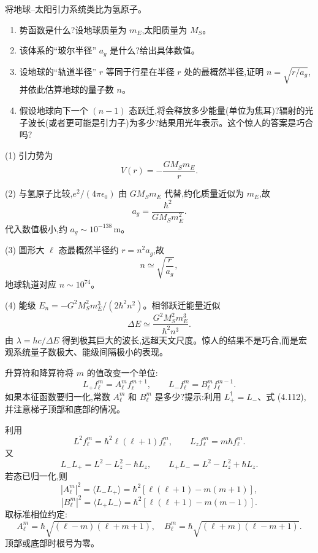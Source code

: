 \begin{question}
将地球--太阳引力系统类比为氢原子。
\begin{enumerate}
\item 势函数是什么?设地球质量为 $m_E$,太阳质量为 $M_S$。
\item 该体系的“玻尔半径” $a_g$ 是什么?给出具体数值。
\item 设地球的“轨道半径” $r$ 等同于行星在半径 $r$ 处的最概然半径,证明 $n=\sqrt{r/a_g}$,并依此估算地球的量子数 $n$。
\item 假设地球向下一个 $(n-1)$ 态跃迁,将会释放多少能量(单位为焦耳)?辐射的光子波长(或者更可能是引力子)为多少?结果用光年表示。这个惊人的答案是巧合吗?
\end{enumerate}
\begin{solution}

(1) 引力势为
\[
V(r)=-\frac{GM_Sm_E}{r}.
\]

(2) 与氢原子比较,$e^2/(4\pi\epsilon_0)$ 由 $GM_Sm_E$ 代替,约化质量近似为 $m_E$,故
\[
a_g=\frac{\hbar^2}{G M_S m_E^2}.
\]
代入数值极小,约 $a_g\sim 10^{-138}\,\mathrm m$。

(3) 圆形大 $\ell$ 态最概然半径约 $r=n^2a_g$,故
\[
n\simeq\sqrt{\frac{r}{a_g}},
\]
地球轨道对应 $n\sim 10^{74}$。

(4) 能级 $E_n=-G^2M_S^2m_E^3/(2\hbar^2n^2)$。相邻跃迁能量近似
\[
\Delta E\simeq \frac{G^2M_S^2m_E^3}{\hbar^2n^3}.
\]
由 $\lambda=hc/\Delta E$ 得到极其巨大的波长,远超天文尺度。惊人的结果不是巧合,而是宏观系统量子数极大、能级间隔极小的表现。

\end{solution}
\end{question}

\begin{question}
升算符和降算符将 $m$ 的值改变一个单位:
\[
L_+f_\ell^m=A_\ell^m f_\ell^{m+1},\qquad
L_-f_\ell^m=B_\ell^m f_\ell^{m-1}.
\]
如果本征函数要归一化,常数 $A_\ell^m$ 和 $B_\ell^m$ 是多少?提示:利用 $L_+^\dagger=L_-$、式 (4.112),并注意梯子顶部和底部的情况。

\par\smallskip
{}

\begin{solution}

利用
\[
L^2f_\ell^m=\hbar^2\ell(\ell+1)f_\ell^m,
\qquad L_zf_\ell^m=m\hbar f_\ell^m.
\]
又
\[
L_-L_+=L^2-L_z^2-\hbar L_z,
\qquad
L_+L_-=L^2-L_z^2+\hbar L_z.
\]
若态已归一化,则
\[
|A_\ell^m|^2=\langle L_-L_+\rangle
=\hbar^2[\ell(\ell+1)-m(m+1)],
\]
\[
|B_\ell^m|^2=\langle L_+L_-\rangle
=\hbar^2[\ell(\ell+1)-m(m-1)].
\]
取标准相位约定:
\[
A_\ell^m=\hbar\sqrt{(\ell-m)(\ell+m+1)},
\quad
B_\ell^m=\hbar\sqrt{(\ell+m)(\ell-m+1)}.
\]
顶部或底部时根号为零。

\end{solution}
\end{question}

